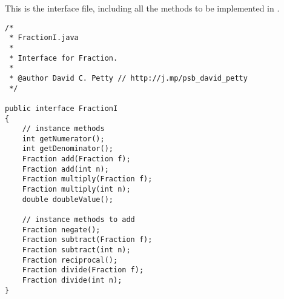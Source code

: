 \documentclass{article}%
\begin{document}
\begin{multicols}{2}
This is the  interface file, including all the methods to be implemented in . \\

\begin{lstlisting}[caption=\code{\href{https://pastebin.com/5btYEgPs}{FractionI.java}},label=FractionI]
/*
 * FractionI.java
 *
 * Interface for Fraction.
 *
 * @author David C. Petty // http://j.mp/psb_david_petty
 */

public interface FractionI
{
    // instance methods
    int getNumerator();
    int getDenominator();
    Fraction add(Fraction f);
    Fraction add(int n);
    Fraction multiply(Fraction f);
    Fraction multiply(int n);
    double doubleValue();

    // instance methods to add
    Fraction negate();
    Fraction subtract(Fraction f);
    Fraction subtract(int n);
    Fraction reciprocal();
    Fraction divide(Fraction f);
    Fraction divide(int n);
}
\end{lstlisting}

\end{multicols}

\printbibliography

\end{document}
